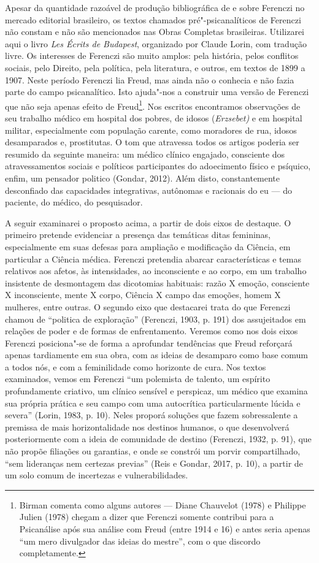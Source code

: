 Apesar da quantidade razoável de produção bibliográfica de e sobre
Ferenczi no mercado editorial brasileiro, os textos chamados
pré"-psicanalíticos de Ferenczi não constam e não são mencionados nas
Obras Completas brasileiras. Utilizarei aqui o livro \emph{Les Écrits de
Budapest}, organizado por Claude Lorin, com tradução livre. Os
interesses de Ferenczi são muito amplos: pela história, pelos conflitos
sociais, pelo Direito, pela política, pela literatura, e outros, em
textos de 1899 a 1907. Neste período Ferenczi lia Freud, mas ainda não o
conhecia e não fazia parte do campo psicanalítico. Isto ajuda"-nos a
construir uma versão de Ferenczi que não seja apenas efeito de
Freud\footnote{Birman comenta como alguns autores --- Diane Chauvelot
  (1978) e Philippe Julien (1978) chegam a dizer que Ferenczi somente
  contribui para a Psicanálise após sua análise com Freud (entre 1914 e
  16) e antes seria apenas ``um mero divulgador das ideias do mestre'',
  com o que discordo completamente.}. Nos escritos encontramos
observações de seu trabalho médico em hospital dos pobres, de idosos
(\emph{Erzsebet)} e em hospital militar, especialmente com população
carente, como moradores de rua, idosos desamparados e, prostitutas. O
tom que atravessa todos os artigos poderia ser resumido da seguinte
maneira: um médico clínico engajado, consciente dos atravessamentos
sociais e políticos participantes do adoecimento físico e psíquico,
enfim, um pensador politico (Gondar, 2012). Além disto, constantemente
desconfiado das capacidades integrativas, autônomas e racionais do eu ---
do paciente, do médico, do pesquisador.

A seguir examinarei o proposto acima, a partir de dois eixos de
destaque. O primeiro pretende evidenciar a presença das temáticas ditas
femininas, especialmente em suas defesas para ampliação e modificação da
Ciência, em particular a Ciência médica. Ferenczi pretendia abarcar
características e temas relativos aos afetos, às intensidades, ao
inconsciente e ao corpo, em um trabalho insistente de desmontagem das
dicotomias habituais: razão X emoção, consciente X inconsciente, mente X
corpo, Ciência X campo das emoções, homem X mulheres, entre outras. O
segundo eixo que destacarei trata do que Ferenczi chamou de ``politica
de exploração'' (Ferenczi, 1903, p. 191) dos assujeitados em relações de
poder e de formas de enfrentamento. Veremos como nos dois eixos Ferenczi
posiciona"-se de forma a aprofundar tendências que Freud reforçará apenas
tardiamente em sua obra, com as ideias de desamparo como base comum a
todos nós, e com a feminilidade como horizonte de cura. Nos textos
examinados, vemos em Ferenczi ``um polemista de talento, um espírito
profundamente criativo, um clínico sensível e perspicaz, um médico que
examina sua própria prática e seu campo com uma autocrítica
particularmente lúcida e severa'' (Lorin, 1983, p. 10). Neles proporá
soluções que fazem sobressalente a premissa de mais horizontalidade nos
destinos humanos, o que desenvolverá posteriormente com a ideia de
comunidade de destino (Ferenczi, 1932, p. 91), que não propõe filiações
ou garantias, e onde se constrói um porvir compartilhado, ``sem
lideranças nem certezas previas'' (Reis e Gondar, 2017, p. 10), a partir
de um solo comum de incertezas e vulnerabilidades.


